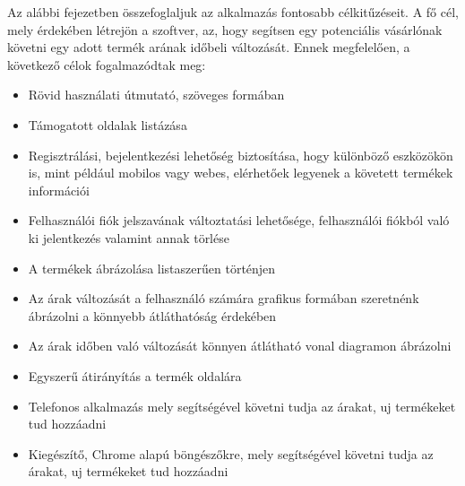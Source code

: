 Az alábbi fejezetben összefoglaljuk az alkalmazás fontosabb célkitűzéseit. A fő cél, mely érdekében létrejön a szoftver, az, hogy segítsen egy potenciális vásárlónak követni egy adott termék arának időbeli változását. Ennek megfelelően, a következő célok fogalmazódtak meg:
\begin{itemize}
    \item Rövid használati útmutató, szöveges formában
    \item Támogatott oldalak listázása
    \item Regisztrálási, bejelentkezési lehetőség biztosítása, hogy különböző eszközökön is, mint például mobilos vagy webes, elérhetőek legyenek a követett termékek információi
    \item Felhasználói fiók jelszavának változtatási lehetősége, felhasználói fiókból való ki jelentkezés valamint annak törlése
    \item A termékek ábrázolása listaszerűen történjen
    \item Az árak változását a felhasználó számára grafikus formában szeretnénk ábrázolni a könnyebb átláthatóság érdekében
    \item Az árak időben való változását könnyen átlátható vonal diagramon ábrázolni
    \item Egyszerű átirányítás a termék oldalára
    \item Telefonos alkalmazás mely segítségével követni tudja az árakat, uj termékeket tud hozzáadni
	\item Kiegészítő, Chrome alapú böngészőkre, mely segítségével követni tudja az árakat, uj termékeket tud hozzáadni
\end{itemize}